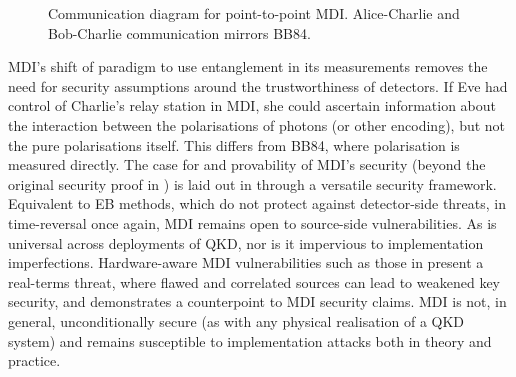 \documentclass[9pt,technote]{IEEEtran}
\begin{document}
\begin{figure}[h]
\begin{subfigure}
        \caption{Communication diagram for point-to-point MDI. Alice-Charlie and Bob-Charlie communication mirrors BB84.}
        \label{mdi_comm}
    \end{subfigure}
\end{figure}

MDI's shift of paradigm to use entanglement in its measurements removes the need for security assumptions around the trustworthiness of detectors. If Eve had control of Charlie's relay station in MDI, she could ascertain information about the interaction between the polarisations of photons (or other encoding), but not the pure polarisations itself. This differs from BB84, where polarisation is measured directly. The case for and provability of MDI's security (beyond the original security proof in \cite{Lo_2012}) is laid out in \cite{Primaatmaja2019} through a versatile security framework. Equivalent to EB methods, which do not protect against detector-side threats, in time-reversal once again, MDI remains open to source-side vulnerabilities. As is universal across deployments of QKD, nor is it impervious to implementation imperfections. Hardware-aware MDI vulnerabilities such as those in \cite{GU20222167} present a real-terms threat, where flawed and correlated sources can lead to weakened key security, and \cite{Lu:23} demonstrates a counterpoint to MDI security claims. MDI is not, in general, unconditionally secure (as with any physical realisation of a QKD system) and remains susceptible to implementation attacks both in theory and practice.
\end{document}
